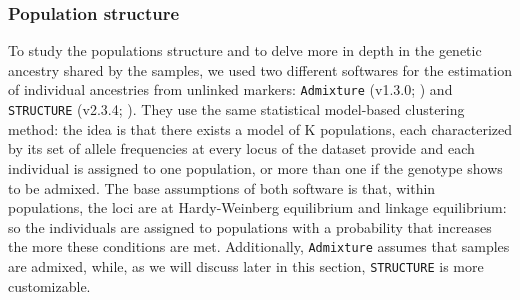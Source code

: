 \documentclass[a4paper, 12pt]{report}
\begin{document}
\subsubsection{Population structure}
To study the populations structure and to delve more in depth in the genetic ancestry shared by the samples, we used two different softwares for the estimation of individual ancestries from unlinked markers: \texttt{Admixture} (v1.3.0; \cite{alexanderFastModelbasedEstimation2009}) and \texttt{STRUCTURE} (v2.3.4; \cite{falushInferencePopulationStructure2003}). They use the same statistical model-based \parencite{alexanderAdmixture13Software2020} clustering method: the idea is that there exists a model of K populations, each characterized by its set of allele frequencies at every locus of the dataset provide \parencite{pritchardDocumentationStructureSoftware2010} and each individual is assigned to one population, or more than one if the genotype shows to be admixed. The base assumptions of both software is that, within populations, the loci are at Hardy-Weinberg equilibrium and linkage equilibrium: so the individuals are assigned to populations with a probability that increases the more these conditions are met. Additionally, \texttt{Admixture} assumes that samples are admixed, while, as we will discuss later in this section, \texttt{STRUCTURE} is more customizable.
\end{document}
